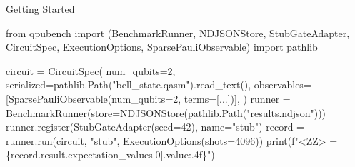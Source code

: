 \documentclass[
  ignorenonframetext,
  aspectratio=169,
]{beamer}
\newenvironment{Shaded}{\begin{snugshade}}{\end{snugshade}}
\newcommand{\BuiltInTok}[1]{\textcolor[rgb]{0.50,0.55,0.55}{#1}}
\newcommand{\DecValTok}[1]{\textcolor[rgb]{0.96,0.45,0.00}{#1}}
\newcommand{\ImportTok}[1]{\textcolor[rgb]{0.15,0.68,0.38}{#1}}
\newcommand{\NormalTok}[1]{\textcolor[rgb]{0.81,0.81,0.76}{#1}}
\newcommand{\OperatorTok}[1]{\textcolor[rgb]{0.81,0.81,0.76}{#1}}
\newcommand{\SpecialCharTok}[1]{\textcolor[rgb]{0.24,0.68,0.91}{#1}}
\newcommand{\SpecialStringTok}[1]{\textcolor[rgb]{0.85,0.27,0.33}{#1}}
\newcommand{\StringTok}[1]{\textcolor[rgb]{0.96,0.31,0.31}{#1}}
\begin{document}
\begin{frame}[fragile]{Getting Started}
\label{getting-started}
\footnotesize

\begin{Shaded}
\begin{Highlighting}[]
\ImportTok{from}\NormalTok{ qpubench }\ImportTok{import}\NormalTok{ (BenchmarkRunner, NDJSONStore, StubGateAdapter,}
\NormalTok{                       CircuitSpec, ExecutionOptions, SparsePauliObservable)}
\ImportTok{import}\NormalTok{ pathlib}

\NormalTok{circuit }\OperatorTok{=}\NormalTok{ CircuitSpec(}
\NormalTok{    num\_qubits}\OperatorTok{=}\DecValTok{2}\NormalTok{, serialized}\OperatorTok{=}\NormalTok{pathlib.Path(}\StringTok{"bell\_state.qasm"}\NormalTok{).read\_text(),}
\NormalTok{    observables}\OperatorTok{=}\NormalTok{[SparsePauliObservable(num\_qubits}\OperatorTok{=}\DecValTok{2}\NormalTok{, terms}\OperatorTok{=}\NormalTok{[...])],}
\NormalTok{)}
\NormalTok{runner }\OperatorTok{=}\NormalTok{ BenchmarkRunner(store}\OperatorTok{=}\NormalTok{NDJSONStore(pathlib.Path(}\StringTok{"results.ndjson"}\NormalTok{)))}
\NormalTok{runner.register(StubGateAdapter(seed}\OperatorTok{=}\DecValTok{42}\NormalTok{), name}\OperatorTok{=}\StringTok{"stub"}\NormalTok{)}
\NormalTok{record }\OperatorTok{=}\NormalTok{ runner.run(circuit, }\StringTok{"stub"}\NormalTok{, ExecutionOptions(shots}\OperatorTok{=}\DecValTok{4096}\NormalTok{))}
\BuiltInTok{print}\NormalTok{(}\SpecialStringTok{f"\textless{}ZZ\textgreater{} = }\SpecialCharTok{\{}\NormalTok{record}\SpecialCharTok{.}\NormalTok{result}\SpecialCharTok{.}\NormalTok{expectation\_values[}\DecValTok{0}\NormalTok{]}\SpecialCharTok{.}\NormalTok{value}\SpecialCharTok{:.4f\}}\SpecialStringTok{"}\NormalTok{)}
\end{Highlighting}
\end{Shaded}

\normalsize
\end{frame}
\end{document}
